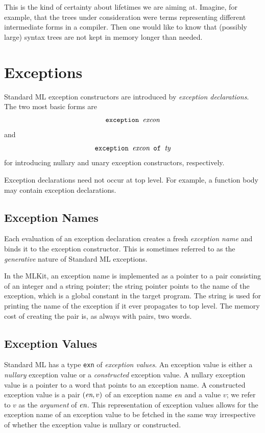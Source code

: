 \documentclass[12pt]{book}
\begin{document}
This is the kind of certainty about lifetimes we are aiming at.
Imagine, for example, that the trees under consideration were terms
representing different intermediate forms in a compiler. Then one
would like to know that (possibly large) syntax trees are not kept in
memory longer than needed.

\chapter{Exceptions}
\label{exceptions.sec}

Standard ML
%
%
exception constructors are introduced by
%
%
{\em exception declarations}. The two most basic forms are
$$\hbox{\tt exception {\it excon}}$$
and
$$\hbox{\tt exception {\it excon} of {\it ty}}$$
for introducing nullary
and unary exception constructors, respectively.

Exception declarations need not occur at top level. For example, a
function body may contain exception declarations.

\section{Exception Names}
Each evaluation of an exception declaration creates a fresh
%
%
{\em exception name\/} and binds it to the exception constructor. This
is sometimes referred to as the {\em generative\/} nature of Standard
ML exceptions.

In the MLKit, an exception name is implemented as a pointer to a pair
consisting of an integer and a string pointer; the string pointer
points to the name of the exception, which is a global constant in the
target program. The string is used for printing the name of the
exception if it ever propagates to top level. The memory cost of
creating the pair is, as always with pairs, two words.

\section{Exception Values}
Standard ML has a type
%
{\tt exn} of
%
{\em exception values}.  An exception value is either a
%
{\em nullary\/} exception value or a
%
{\em constructed\/} exception value. A nullary exception value is a
pointer to a word that points to an exception name. A constructed
exception value is a pair $(\hbox{\it en},v)$ of an exception name $\hbox{\it en}$
and a value $v$; we refer to $v$ as the {\em argument\/} of $\hbox{\it en}$.
This representation of exception values allows for the exception name
of an exception value to be fetched in the same way irrespective of
whether the exception value is nullary or constructed.
\end{document}

